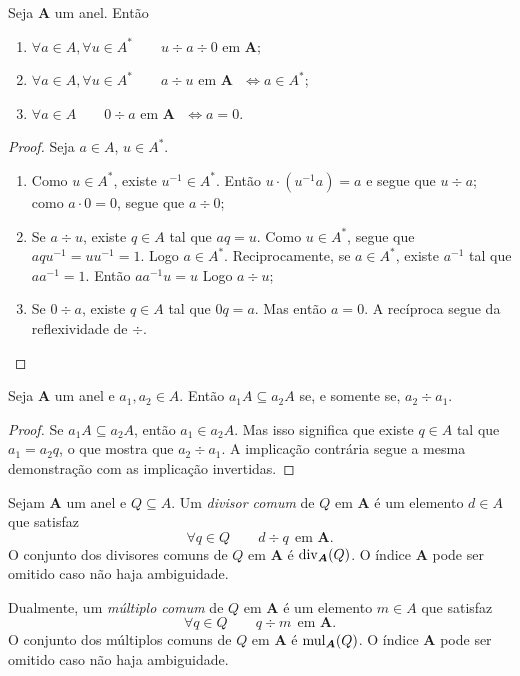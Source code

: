 \begin{prop}
	Seja $\bm A$ um anel. Então
	\begin{enumerate}
	\item $\forall a \in A,\forall u \in A^* \qquad u \div a \div 0$ em $\bm A$;
	\item $\forall a \in A,\forall u \in A^* \qquad a \div u \text{\ \ em $\bm A$\ \ } \Leftrightarrow a \in A^*$;
	\item $\forall a \in A \qquad 0 \div a \text{\ \ em $\bm A$\ \ } \Leftrightarrow a=0$.
	\end{enumerate}
\end{prop}
\begin{proof} Seja $a \in A$, $u \in A^*$.
	\begin{enumerate}
	\item Como $u \in A^*$, existe $u^{-1} \in A^*$. Então $u\cdot(u^{-1}a) = a$ e segue que $u \div a$; como $a \cdot 0 = 0$, segue que $a \div 0$;
	\item Se $a \div u$, existe $q \in A$ tal que $aq=u$. Como $u \in A^*$, segue que $aqu^{-1}=uu^{-1}=1$. Logo $a \in A^*$. Reciprocamente, se $a \in A^*$, existe $a^{-1}$ tal que $aa^{-1}=1$. Então $aa^{-1}u=u$ Logo $a \div u$;
	\item Se $0 \div a$, existe $q \in A$ tal que $0q=a$. Mas então $a=0$. A recíproca segue da reflexividade de $\div$.
	\end{enumerate}
\end{proof}

\begin{prop}
	Seja $\bm A$ um anel e $a_1,a_2 \in A$. Então $a_1A \subseteq a_2A$ se, e somente se, $a_2 \div a_1$.
\end{prop}
\begin{proof}
	Se $a_1A \subseteq a_2A$, então $a_1 \in a_2A$. Mas isso significa que existe $q \in A$ tal que $a_1=a_2q$, o que mostra que $a_2 \div a_1$. A implicação contrária segue a mesma demonstração com as implicação invertidas.
\end{proof}

\begin{defi}
	Sejam $\bm A$ um anel e $Q \subseteq A$. Um \emph{divisor comum} de $Q$ em $\bm A$ é um elemento $d \in A$ que satisfaz
	\begin{equation*}
	\forall q \in Q \qquad d \div q \ \ \text{em $\bm A$}.
	\end{equation*}
O conjunto dos divisores comuns de $Q$ em $\bm A$ é $\operatorname{div}_{\bm A}(Q)$. O índice $\bm A$ pode ser omitido caso não haja ambiguidade.

Dualmente, um \emph{múltiplo comum} de $Q$ em $\bm A$ é um elemento $m \in A$ que satisfaz
	\begin{equation*}
	\forall q \in Q \qquad q \div m \ \ \text{em $\bm A$}.
	\end{equation*}
O conjunto dos múltiplos comuns de $Q$ em $\bm A$ é $\operatorname{mul}_{\bm A}(Q)$. O índice $\bm A$ pode ser omitido caso não haja ambiguidade.
\end{defi}

